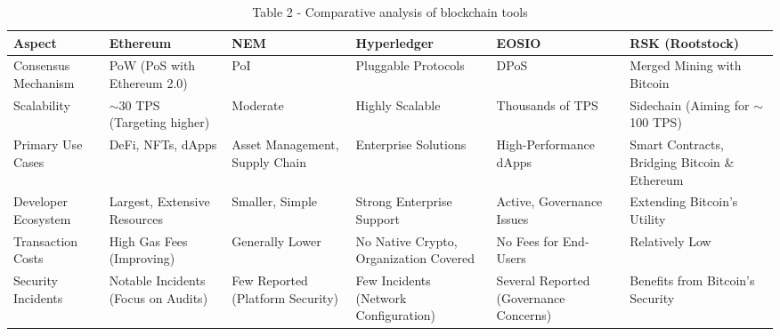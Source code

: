 \begin{table}[H]
\caption*{Table 2 - Comparative analysis of blockchain tools}
\centering
\begin{tabular}{|p{}|p{}|p{}|p{}|p{}|p{}|}
\hline
Aspect & Ethereum & NEM & Hyperledger & EOSIO & RSK (Rootstock) \\ \hline
Consensus Mechanism & PoW (PoS with Ethereum 2.0) & PoI & Pluggable Protocols & DPoS & Merged Mining with Bitcoin \\ \hline
Scalability & $\sim$30 TPS (Targeting higher) & Moderate & Highly Scalable & Thousands of TPS & Sidechain (Aiming for $\sim$100 TPS) \\ \hline
Primary Use Cases & DeFi, NFTs, dApps & Asset Management, Supply Chain & Enterprise Solutions & High-Performance dApps & Smart Contracts, Bridging Bitcoin \& Ethereum \\ \hline
Developer Ecosystem & Largest, Extensive Resources & Smaller, Simple & Strong Enterprise Support & Active, Governance Issues & Extending Bitcoin's Utility \\ \hline
Transaction Costs & High Gas Fees (Improving) & Generally Lower & No Native Crypto, Organization Covered & No Fees for End-Users & Relatively Low \\ \hline
Security Incidents & Notable Incidents (Focus on Audits) & Few Reported (Platform Security) & Few Incidents (Network Configuration) & Several Reported (Governance Concerns) & Benefits from Bitcoin's Security \\ \hline
\end{tabular}
\end{table}

